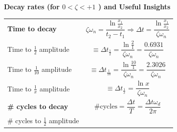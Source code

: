 \documentclass[
]{book}
\begin{document}
\textbf{Decay rates (for \(0 < \zeta < +1\) ) and Useful Insights}

\begin{longtable}[]{@{}ll@{}}
\toprule
\endhead
\begin{minipage}[t]{0.24\columnwidth}\raggedright
\textbf{Time to decay}\strut
\end{minipage} & \begin{minipage}[t]{0.71\columnwidth}\raggedright
\[\zeta \omega_n = \frac{\ln \frac{x_1}{x_2} }{t_2 - t_1} \Rightarrow \Delta t = \frac{\ln \frac{x_1}{x_2}}{\zeta \omega_n} \]\strut
\end{minipage}\tabularnewline
\begin{minipage}[t]{0.24\columnwidth}\raggedright
Time to \(\frac{1}{2}\) amplitude\strut
\end{minipage} & \begin{minipage}[t]{0.71\columnwidth}\raggedright
\[ \equiv \Delta t_{\frac{1}{2}} = \frac{\ln \frac{2}{1}}{\zeta \omega_n} = \frac{0.6931}{\zeta \omega_n}  \]\strut
\end{minipage}\tabularnewline
\begin{minipage}[t]{0.24\columnwidth}\raggedright
Time to \(\frac{1}{10}\) amplitude\strut
\end{minipage} & \begin{minipage}[t]{0.71\columnwidth}\raggedright
\[ \equiv \Delta t_{\frac{1}{10}} = \frac{\ln \frac{10}{1}}{\zeta \omega_n} = \frac{2.3026}{\zeta \omega_n}  \]\strut
\end{minipage}\tabularnewline
\begin{minipage}[t]{0.24\columnwidth}\raggedright
Time to \(\frac{1}{x}\) amplitude\strut
\end{minipage} & \begin{minipage}[t]{0.71\columnwidth}\raggedright
\[ \equiv \Delta t_{\frac{1}{x}} = \frac{\ln x }{\zeta \omega_n}  \]\strut
\end{minipage}\tabularnewline
\begin{minipage}[t]{0.24\columnwidth}\raggedright
\textbf{\# cycles to decay}\strut
\end{minipage} & \begin{minipage}[t]{0.71\columnwidth}\raggedright
\[\text{\# cycles} = \frac{\Delta t }{T} = \frac{\Delta t \omega_d}{2 \pi} \]\strut
\end{minipage}\tabularnewline
\begin{minipage}[t]{0.24\columnwidth}\raggedright
\# cycles to \(\frac{1}{2}\) amplitude\strut
\end{minipage} & \begin{minipage}[t]{0.71\columnwidth}\raggedright

\end{minipage}
\end{longtable}
\end{document}
